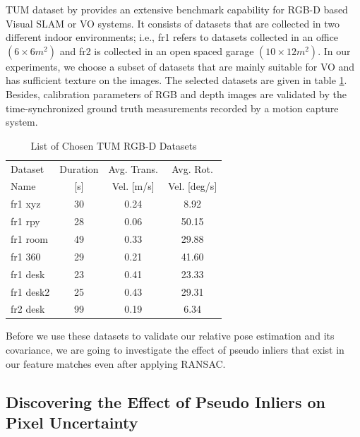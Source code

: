 \documentclass[a4paper]{report}
\numberwithin{figure}{section}
\begin{document}
TUM dataset by \parencite{Sturm2012a} provides an extensive benchmark 
capability for RGB-D based Visual SLAM or VO systems. It consists of datasets 
that are collected in two different indoor environments; i.e., fr1 refers to 
datasets collected in an office $(6\times 6 m^2)$ and fr2 is collected in an 
open spaced garage $(10\times 12m^2)$. In our experiments, we choose a subset 
of datasets that are mainly suitable for VO and has sufficient texture on the 
images.  The selected datasets are given in table \ref{tb:tum_dataset}.  
Besides, calibration parameters of RGB and depth images are validated by the 
time-synchronized ground truth measurements recorded by a motion capture 
system.

\begin{table}
\begin{center}
  \begin{tabular}{lccc}
    \hline
    Dataset & Duration & Avg. Trans. & Avg. Rot.\\
     Name & [s] & Vel. [m/s] & Vel. [deg/s]\\
    \hline
    fr1 xyz   & 30 & 0.24 & 8.92\\
    fr1 rpy   & 28 & 0.06 & 50.15\\
    fr1 room  & 49 & 0.33 & 29.88\\
    fr1 360   & 29 & 0.21 & 41.60\\
    fr1 desk  & 23 & 0.41 & 23.33\\
    fr1 desk2 & 25 & 0.43 & 29.31\\
    fr2 desk  & 99 & 0.19 & 6.34\\
    \hline
  \end{tabular}
\end{center}
  \caption{List of Chosen TUM RGB-D Datasets}
  \label{tb:tum_dataset}
\end{table}

Before we use these datasets to validate 
our relative pose estimation and its covariance, 
we are going to investigate the effect of pseudo inliers that 
exist in our feature matches even after applying RANSAC. 

\subsection{Discovering the Effect of Pseudo Inliers on Pixel Uncertainty}\label{sc_pseudo_inliers}
\end{document}
